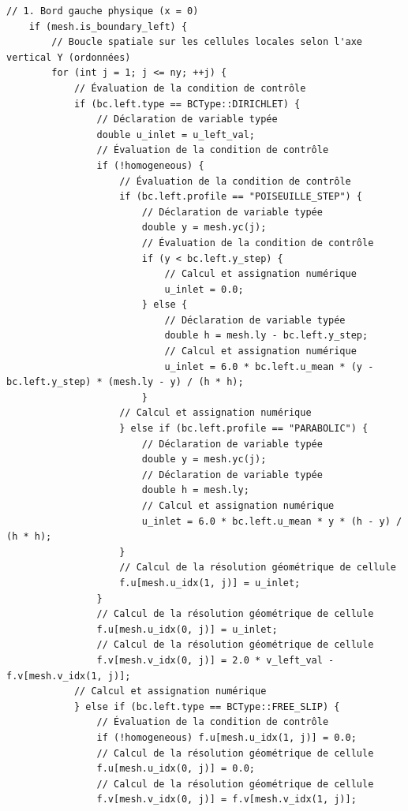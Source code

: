 \documentclass[10pt,a4paper,oneside]{book}
\begin{document}
\begin{lstlisting}[language={[11]C++}]
    // 1. Bord gauche physique (x = 0)
    if (mesh.is_boundary_left) {
        // Boucle spatiale sur les cellules locales selon l'axe vertical Y (ordonnées)
        for (int j = 1; j <= ny; ++j) {
            // Évaluation de la condition de contrôle
            if (bc.left.type == BCType::DIRICHLET) {
                // Déclaration de variable typée
                double u_inlet = u_left_val;
                // Évaluation de la condition de contrôle
                if (!homogeneous) {
                    // Évaluation de la condition de contrôle
                    if (bc.left.profile == "POISEUILLE_STEP") {
                        // Déclaration de variable typée
                        double y = mesh.yc(j);
                        // Évaluation de la condition de contrôle
                        if (y < bc.left.y_step) {
                            // Calcul et assignation numérique
                            u_inlet = 0.0;
                        } else {
                            // Déclaration de variable typée
                            double h = mesh.ly - bc.left.y_step;
                            // Calcul et assignation numérique
                            u_inlet = 6.0 * bc.left.u_mean * (y - bc.left.y_step) * (mesh.ly - y) / (h * h);
                        }
                    // Calcul et assignation numérique
                    } else if (bc.left.profile == "PARABOLIC") {
                        // Déclaration de variable typée
                        double y = mesh.yc(j);
                        // Déclaration de variable typée
                        double h = mesh.ly;
                        // Calcul et assignation numérique
                        u_inlet = 6.0 * bc.left.u_mean * y * (h - y) / (h * h);
                    }
                    // Calcul de la résolution géométrique de cellule
                    f.u[mesh.u_idx(1, j)] = u_inlet;
                }
                // Calcul de la résolution géométrique de cellule
                f.u[mesh.u_idx(0, j)] = u_inlet;
                // Calcul de la résolution géométrique de cellule
                f.v[mesh.v_idx(0, j)] = 2.0 * v_left_val - f.v[mesh.v_idx(1, j)];
            // Calcul et assignation numérique
            } else if (bc.left.type == BCType::FREE_SLIP) {
                // Évaluation de la condition de contrôle
                if (!homogeneous) f.u[mesh.u_idx(1, j)] = 0.0;
                // Calcul de la résolution géométrique de cellule
                f.u[mesh.u_idx(0, j)] = 0.0;
                // Calcul de la résolution géométrique de cellule
                f.v[mesh.v_idx(0, j)] = f.v[mesh.v_idx(1, j)];

\end{lstlisting}
\end{document}
